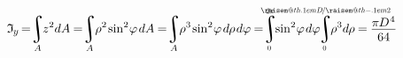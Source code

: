 \documentclass[14pt]{extarticle}
\makeatletter
\newcommand{\raisemath}[1]{\mathpalette{\raisem@th{#1}}}
\newcommand{\raisem@th}[3]{\raisebox{#1}{$#2#3$}}
\DeclareMathOperator*{\integral}{\scalerel*{\rotatebox{12}{$\!\textstyle\int\!$}}{\int}} %
\newcommand\sine{\operatorname{sin}}
\makeatother
\begin{document}
\[\begin{gathered}
%
\mathfrak{I}_{\hspace{-0.1ex}\scalebox{.8}{$y$}} \hspace{-0.25ex}
=\hspace{-0.6ex}
\integral_{A} \hspace{-0.7ex} z^2 dA \hspace{-0.1ex}
=\hspace{-0.6ex}
\integral_{A} \hspace{-0.6ex} \rho^2 \hspace{-.2ex} \sine^{2} \hspace{-.33ex} \varphi \hspace{.25ex} dA \hspace{-0.1ex}
=\hspace{-0.6ex}
\integral_{A} \hspace{-0.6ex} \rho^3 \hspace{-.2ex} \sine^{2} \hspace{-.33ex} \varphi \hspace{.25ex} d\hspace{-.1ex}\rho \hspace{.2ex} d\varphi \hspace{-0.1ex}
=\hspace{-0.6ex}
\integral_{\mathclap{\hspace{-.4ex} \scalebox{.6}{$ 0 $}}}^{\mathclap{\scalebox{.6}{$ 2\pi $}}} \hspace{-.7ex} \sine^{2} \hspace{-.33ex} \varphi \hspace{.2ex} d\varphi \hspace{-.6ex}
\integral_{\mathclap{\hspace{-.4ex} \scalebox{.6}{$ 0 $}}}^{\mathclap{\scalebox{.6}{$ \raisemath{.1em}{D} \hspace{-.3ex} / \hspace{-.1ex} \raisemath{-.1em}{2} $}}} \hspace{-0.7ex} \rho^3 d\hspace{-.1ex}\rho \hspace{-0.1ex}
=\hspace{-0.1ex}
\displaystyle\frac{\raisebox{-0.18em}{$\pi \hspace{-0.1ex} D^{\hspace{.1ex}4}$}}{64}
\end{gathered}\]
\end{document}
